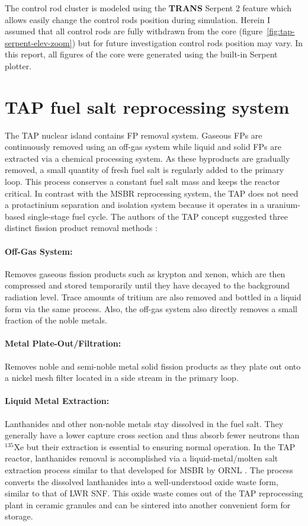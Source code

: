 The control rod cluster is modeled using the \textbf{TRANS} Serpent 2 feature 
which allows easily change the control rods position during simulation. 
Herein I assumed that all control rods are fully withdrawn from the core 
(figure~\ref{fig:tap-serpent-elev-zoom}) but for future investigation control 
rods position may vary. In this report, all figures of the core were 
generated using the built-in Serpent plotter.

\section{TAP fuel salt reprocessing system}
The \gls{TAP} nuclear island contains \gls{FP} removal system. Gaseous  
\glspl{FP} are continuously removed using an off-gas system while liquid and 
solid \glspl{FP} are extracted via a chemical processing system. As these 
byproducts are gradually removed, a small quantity of fresh fuel salt is 
regularly added to the primary loop. This process conserves a constant fuel 
salt mass and keeps the reactor critical. In contrast with the \gls{MSBR} 
reprocessing system, the \gls{TAP} does not need a protactinium separation and 
isolation system because it operates in a uranium-based single-stage fuel 
cycle. The authors of the \gls{TAP} concept suggested three distinct fission 
product removal methods \cite{transatomic_power_corporation_neutronics_2016}:
\paragraph{Off-Gas System:} Removes gaseous fission products such as krypton 
and xenon, which are then compressed and stored temporarily until they have 
decayed to the background radiation level. Trace amounts of tritium are also 
removed and bottled in a liquid form via the same process. Also, the off-gas 
system also directly removes a small fraction of the noble metals.
\paragraph{Metal Plate-Out/Filtration:} Removes noble and semi-noble metal 
solid fission products as they plate out onto a nickel mesh filter located in 
a side stream in the primary loop.
\paragraph{Liquid Metal Extraction:} Lanthanides and other non-noble metals 
stay dissolved in the fuel salt. They generally have a lower capture cross 
section and thus absorb fewer neutrons than $^{135}$Xe but their extraction is 
essential to ensuring normal operation. In the \gls{TAP} reactor, lanthanides 
removal is accomplished via a liquid-metal/molten salt extraction process 
similar to that developed for \gls{MSBR} by \gls{ORNL}  
\cite{robertson_conceptual_1971}. The process converts the dissolved 
lanthanides into a well-understood oxide waste form, similar to that of 
\gls{LWR} \gls{SNF}. This oxide waste comes out of the \gls{TAP} reprocessing 
plant in ceramic granules and can be sintered into another convenient form for 
storage.

